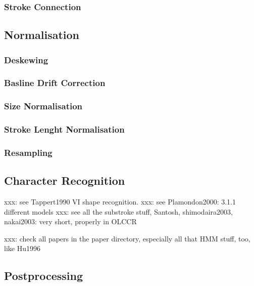 
\subsubsection{Stroke Connection}
\label{sec:strokeconnection}

\subsection{Normalisation} 
\label{sec:normalisation}
\subsubsection{Deskewing}
\label{sec:deskewing}
\subsubsection{Basline Drift Correction} 
\label{sec:baselinedriftcorrection}
\subsubsection{Size Normalisation}
\label{sec:sizenormalisation}
\subsubsection{Stroke Lenght Normalisation}
\label{sec:strokelengthnormalisation}
\subsubsection{Resampling}
\label{sec:resampling}





\subsection{Character Recognition}
\label{sec:characterrecognition}

xxx: see Tappert1990 VI shape recognition.
xxx: see Plamondon2000: 3.1.1 different models
xxx: see all the substroke stuff, Santosh, shimodaira2003, nakai2003: very short, properly in OLCCR

xxx: check all papers in the paper directory, especially all that HMM stuff,
too, like Hu1996

\subsection{Postprocessing}
\label{sec:postprocessing}

